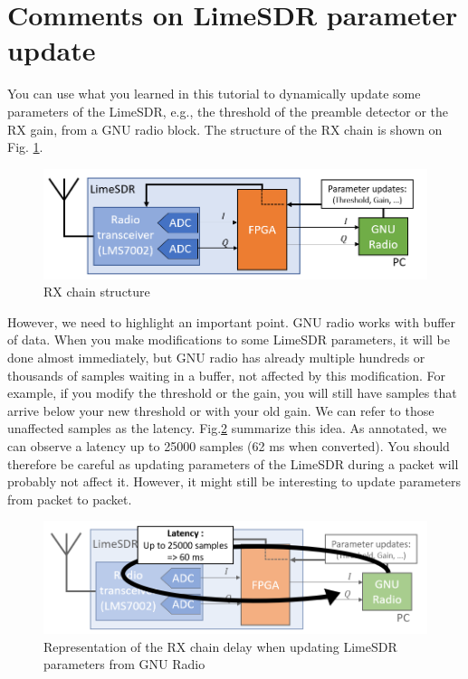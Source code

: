 \section{Comments on LimeSDR parameter update}

You can use what you learned in this tutorial to dynamically update some parameters of the LimeSDR, e.g., the threshold of the preamble detector or the RX gain, from a GNU radio block. The structure of the RX chain is shown on Fig. \ref{fig:Structure}.

 \begin{figure}[H]
    \centering
    \includegraphics[scale=0.8]{figures/Structure.png}
    \caption{RX chain structure}
    \label{fig:Structure}
\end{figure}

However, we need to highlight an important point. GNU radio works with buffer of data. When you make modifications to some LimeSDR parameters, it will be done almost immediately, but GNU radio has already multiple hundreds or thousands of samples waiting in a buffer, not affected by this modification. For example, if you modify the threshold or the gain, you will still have samples that arrive below your new threshold or with your old gain. We can refer to those unaffected samples as the latency. Fig.\ref{fig:Structure_delay} summarize this idea. As annotated, we can observe a latency up to 25000 samples (62 ms when converted).  You should therefore be careful as updating parameters of the LimeSDR during a packet will probably not affect it. However, it might still be interesting to update parameters from packet to packet.

 \begin{figure}[H]
    \centering
    \includegraphics[scale=0.8]{figures/Structure_delay.png}
    \caption{Representation of the RX chain delay when updating LimeSDR parameters from GNU Radio}
    \label{fig:Structure_delay}
\end{figure}
